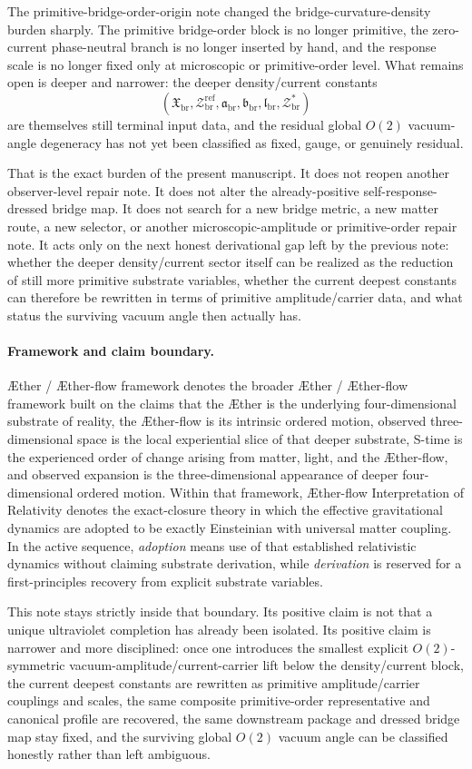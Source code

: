 \documentclass[11pt]{article}
\newcommand{\Aether}{\AE{}ther}
\newcommand{\Aflow}{\AE{}ther-flow}
\newcommand{\TheoryName}{\Aflow{} Interpretation of Relativity}
\newcommand{\TheoryProgram}{\Aether{} / \Aflow{} framework}
\newcommand{\RespDeepDensityRef}{\mathcal Z_{\mathrm{br}}^{\mathrm{ref}}}
\newcommand{\RespDeepDensityEq}{\mathcal Z_{\mathrm{br}}^{\ast}}
\newcommand{\RespDeepReadout}{\mathfrak X_{\mathrm{br}}}
\newcommand{\RespDeepTrack}{\mathfrak a_{\mathrm{br}}}
\newcommand{\RespDeepRelax}{\mathfrak b_{\mathrm{br}}}
\newcommand{\RespDeepWell}{\mathfrak l_{\mathrm{br}}}
\begin{document}
The primitive-bridge-order-origin note changed the bridge-curvature-density burden sharply. The primitive bridge-order block is no longer primitive, the zero-current phase-neutral branch is no longer inserted by hand, and the response scale is no longer fixed only at microscopic or primitive-order level. What remains open is deeper and narrower: the deeper density/current constants
\[
(\RespDeepReadout,\RespDeepDensityRef,\RespDeepTrack,\RespDeepRelax,\RespDeepWell,\RespDeepDensityEq)
\]
are themselves still terminal input data, and the residual global \(O(2)\) vacuum-angle degeneracy has not yet been classified as fixed, gauge, or genuinely residual.

That is the exact burden of the present manuscript. It does not reopen another observer-level repair note. It does not alter the already-positive self-response-dressed bridge map. It does not search for a new bridge metric, a new matter route, a new selector, or another microscopic-amplitude or primitive-order repair note. It acts only on the next honest derivational gap left by the previous note: whether the deeper density/current sector itself can be realized as the reduction of still more primitive substrate variables, whether the current deepest constants can therefore be rewritten in terms of primitive amplitude/carrier data, and what status the surviving vacuum angle then actually has.

\paragraph{Framework and claim boundary.}
\TheoryProgram{} denotes the broader \Aether{} / \Aflow{} framework built on the claims that the \Aether{} is the underlying four-dimensional substrate of reality, the \Aflow{} is its intrinsic ordered motion, observed three-dimensional space is the local experiential slice of that deeper substrate, S-time is the experienced order of change arising from matter, light, and the \Aflow{}, and observed expansion is the three-dimensional appearance of deeper four-dimensional ordered motion. Within that framework, \TheoryName{} denotes the exact-closure theory in which the effective gravitational dynamics are adopted to be exactly Einsteinian with universal matter coupling. In the active sequence, \emph{adoption} means use of that established relativistic dynamics without claiming substrate derivation, while \emph{derivation} is reserved for a first-principles recovery from explicit substrate variables.

This note stays strictly inside that boundary. Its positive claim is not that a unique ultraviolet completion has already been isolated. Its positive claim is narrower and more disciplined: once one introduces the smallest explicit \(O(2)\)-symmetric vacuum-amplitude/current-carrier lift below the density/current block, the current deepest constants are rewritten as primitive amplitude/carrier couplings and scales, the same composite primitive-order representative and canonical profile are recovered, the same downstream package and dressed bridge map stay fixed, and the surviving global \(O(2)\) vacuum angle can be classified honestly rather than left ambiguous.
\end{document}
